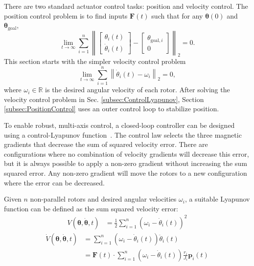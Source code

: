 \documentclass[graybox,usenames]{svmult}
\providecommand{\norm}[1]{\left\lVert#1\right\rVert}
\providecommand{\field}[1]{\mathbb{#1}}
\providecommand{\R}{\field{R}}
\begin{document}
There are two standard actuator control tasks: position and velocity control. 
The position control problem is to find inputs $\mathbf{F}(t)$ such that for any $\bm{\theta}(0)$ and $\bm{\theta}_{\textrm{goal}}$, 
\begin{equation}\lim_{t \to \infty}\sum_{i=1}^n \norm{\begin{bmatrix}\theta_i(t)\\ \dot{\theta}_i(t)\end{bmatrix}-\begin{bmatrix}\theta_{\textrm{goal},i}\\ 0 \end{bmatrix} }_2 = 0.
\end{equation}
This section starts with the simpler velocity control problem
\begin{equation}
\lim_{t \to \infty}\sum_{i=1}^n \norm{ \dot{\theta}_i(t)- \omega_i }_2 = 0,
\end{equation}
where $\omega_i \in \R$ is the desired angular velocity of each rotor. After solving the velocity control problem in Sec. \ref{subsec:ControlLyapunov},   Section \ref{subsec:PositionControl} uses an outer control loop to stabilize position.


To enable robust, multi-axis control, a closed-loop controller can be designed using a control-Lyapunov function~\cite{Artstein1983}.  The control law selects the three magnetic gradients that decrease the sum of squared velocity error. There are configurations where no combination of velocity gradients will decrease this error, but it is always possible to apply a non-zero gradient without increasing the sum squared error. Any non-zero gradient will move the rotors to a new configuration where the error can be decreased.


 Given $n$ non-parallel rotors and desired angular velocities $\omega_i$, a suitable Lyapunov function can be defined as the sum squared velocity error:
   \begin{align}
   \label{eq:LyapunovFunction}
   V(\bm{\theta},\dot{\bm{\theta}},t) &= \frac{1}{2} \sum_{i=1}^n \left(  \omega_i - \dot{\theta}_i(t)\right)^2 
      \end{align}
      \begin{align}
   \label{eq:LyapunovFunctionD}
   \dot{V}(\bm{\theta},\dot{\bm{\theta}},t) &=  \sum_{i=1}^n \left( \omega_i - \dot{\theta}_i(t)  \right) \ddot{\theta}_i(t)   \nonumber \\
  &=  \mathbf{F}(t)\cdot \sum_{i=1}^n \left(  \omega_i - \dot{\theta}_i(t) \right) \frac{r_i}{J_i} \mathbf{p}_i(t)
   \end{align}
\end{document}

